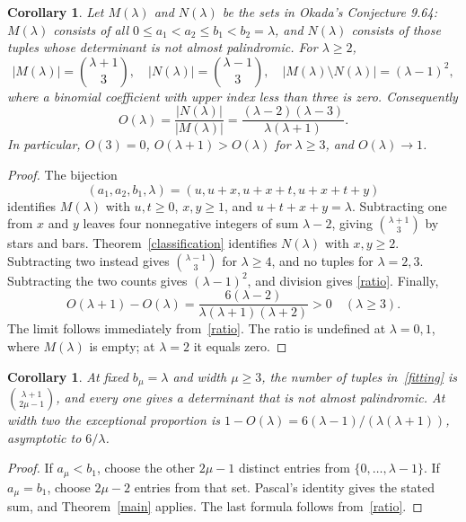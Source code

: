 \documentclass[11pt,a4paper]{article}
\newtheorem{corollary}[theorem]{Corollary}
\begin{document}
\begin{corollary}\label{counting}
Let $M(\lambda)$ and $N(\lambda)$ be the sets in Okada's Conjecture 9.64:
$M(\lambda)$ consists of all $0\le a_1<a_2\le b_1<b_2=\lambda$, and
$N(\lambda)$ consists of those tuples whose determinant is not almost
palindromic. For $\lambda\ge2$,
\[
 |M(\lambda)|=\binom{\lambda+1}{3},\quad
 |N(\lambda)|=\binom{\lambda-1}{3},\quad
 |M(\lambda)\setminus N(\lambda)|=(\lambda-1)^2,
\]
where a binomial coefficient with upper index less than three is zero.
Consequently
\begin{equation}\label{ratio}
 O(\lambda)=\frac{|N(\lambda)|}{|M(\lambda)|}
           =\frac{(\lambda-2)(\lambda-3)}{\lambda(\lambda+1)}.
\end{equation}
In particular, $O(3)=0$, $O(\lambda+1)>O(\lambda)$ for $\lambda\ge3$,
and $O(\lambda)\longrightarrow1$.
\end{corollary}
\begin{proof}
The bijection
\[
 (a_1,a_2,b_1,\lambda)=(u,u+x,u+x+t,u+x+t+y)
\]
identifies $M(\lambda)$ with $u,t\ge0$, $x,y\ge1$, and
$u+t+x+y=\lambda$. Subtracting one from $x$ and $y$ leaves four
nonnegative integers of sum $\lambda-2$, giving $\binom{\lambda+1}{3}$
by stars and bars. Theorem~\ref{classification} identifies $N(\lambda)$
with $x,y\ge2$. Subtracting two instead gives $\binom{\lambda-1}{3}$
for $\lambda\ge4$, and no tuples for $\lambda=2,3$.
Subtracting the two counts gives $(\lambda-1)^2$, and division gives
\eqref{ratio}. Finally,
\[
 O(\lambda+1)-O(\lambda)
 =\frac{6(\lambda-2)}{\lambda(\lambda+1)(\lambda+2)}>0\quad(\lambda\ge3).
\]
The limit follows immediately from~\eqref{ratio}.
The ratio is undefined at $\lambda=0,1$, where $M(\lambda)$ is empty;
at $\lambda=2$ it equals zero.
\end{proof}

\begin{corollary}\label{allwidths}
At fixed $b_\mu=\lambda$ and width $\mu\ge3$, the number of tuples
in~\eqref{fitting} is $\binom{\lambda+1}{2\mu-1}$, and every one gives
a determinant that is not almost palindromic. At width two the exceptional
proportion is $1-O(\lambda)=6(\lambda-1)/(\lambda(\lambda+1))$,
asymptotic to $6/\lambda$.
\end{corollary}
\begin{proof}
If $a_\mu<b_1$, choose the other $2\mu-1$ distinct entries from
$\{0,\ldots,\lambda-1\}$. If $a_\mu=b_1$, choose $2\mu-2$ entries
from that set. Pascal's identity gives the stated sum, and
Theorem~\ref{main} applies. The last formula follows from~\eqref{ratio}.
\end{proof}
\end{document}
